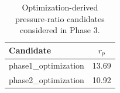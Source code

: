\begin{table}[htbp]
    \centering
    \caption{Optimization-derived pressure-ratio candidates considered in Phase 3.}
    \label{tab:phase3_pressure_ratio_candidates}
    \begin{tabular}{lc}
        \hline
        Candidate & $r_p$ \\
        \hline
        phase1_optimization & 13.69 \\
        phase2_optimization & 10.92 \\
        \hline
    \end{tabular}
\end{table}